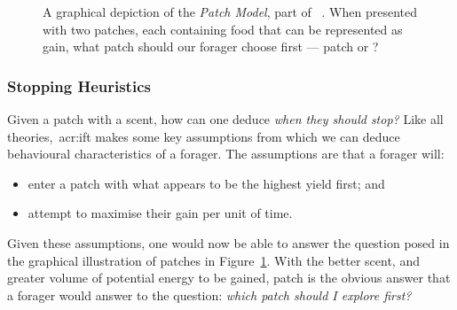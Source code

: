 \begin{figure}[t!]
    \centering
    \caption[The patch model]{A graphical depiction of the \emph{Patch Model}, part of ~. When presented with two patches, each containing food that can be represented as gain, what patch should our forager choose first — patch  or ?}
    \label{fig:patch_model}
\end{figure}

\subsubsection{Stopping Heuristics}\label{sec:stopping_background:theoretical:ift:stopping}
Given a patch with a scent, how can one deduce \emph{when they should stop?} Like all theories,~\gls{acr:ift} makes some key assumptions from which we can deduce behavioural characteristics of a forager. The assumptions are that a forager will:

\begin{itemize}
    \item{enter a patch with what appears to be the highest yield first; and}
    \item{attempt to maximise their gain per unit of time.}
\end{itemize}

Given these assumptions, one would now be able to answer the question posed in the graphical illustration of patches in Figure~\ref{fig:patch_model}. With the better scent, and greater volume of potential energy to be gained, patch  is the obvious answer that a forager would answer to the question: \emph{which patch should I explore first?}

